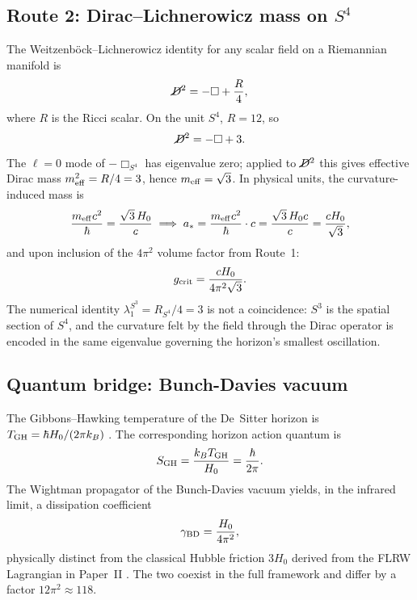 \documentclass[11pt,a4paper]{article}
\newcommand{\slashed}[1]{\cancel{#1}}
\begin{document}
\subsection{Route 2: Dirac--Lichnerowicz mass on \texorpdfstring{$S^4$}{S4}}
\label{subsec:DL}

The Weitzenb\"ock--Lichnerowicz identity for any scalar field on a Riemannian manifold is
\begin{equation}
  \slashed{D}^2 = -\Box + \frac{R}{4},
\end{equation}
where $R$ is the Ricci scalar. On the unit $S^4$, $R = 12$, so
\begin{equation}
  \slashed{D}^2 = -\Box + 3.
\end{equation}
The $\ell=0$ mode of $-\Box_{S^4}$ has eigenvalue zero; applied to $\slashed{D}^2$ this
gives effective Dirac mass $m_{\rm eff}^2 = R/4 = 3$, hence $m_{\rm eff} = \sqrt{3}$.
In physical units, the curvature-induced mass is
\begin{equation}
  \frac{m_{\rm eff}c^2}{\hbar} = \frac{\sqrt{3}\,H_0}{c}
  \implies
  a_* = \frac{m_{\rm eff}c^2}{\hbar}\cdot c = \frac{\sqrt{3}\,H_0 c}{c}
  = \frac{cH_0}{\sqrt{3}},
\end{equation}
and upon inclusion of the $4\pi^2$ volume factor from Route~1:
\begin{equation}
  g_{\rm crit} = \frac{cH_0}{4\pi^2\sqrt{3}}.
\end{equation}
The numerical identity $\lambda_1^{S^3} = R_{S^4}/4 = 3$ is not a coincidence: $S^3$
is the spatial section of $S^4$, and the curvature felt by the field through the Dirac
operator is encoded in the same eigenvalue governing the horizon's smallest oscillation.

\subsection{Quantum bridge: Bunch-Davies vacuum}
\label{subsec:BD}

The Gibbons--Hawking temperature of the De~Sitter horizon is $T_{\rm GH} = \hbar H_0/(2\pi k_B)$
\cite{Gibbons1977}. The corresponding horizon action quantum is
\begin{equation}
  S_{\rm GH} = \frac{k_B T_{\rm GH}}{H_0} = \frac{\hbar}{2\pi}.
\end{equation}
The Wightman propagator of the Bunch-Davies vacuum \cite{Bunch1978} yields, in the
infrared limit, a dissipation coefficient
\begin{equation}
  \gamma_{\rm BD} = \frac{H_0}{4\pi^2},
\end{equation}
physically distinct from the classical Hubble friction $3H_0$ derived from the FLRW
Lagrangian in Paper~II \cite{PaperII}. The two coexist in the full framework and
differ by a factor $12\pi^2 \approx 118$.
\end{document}

